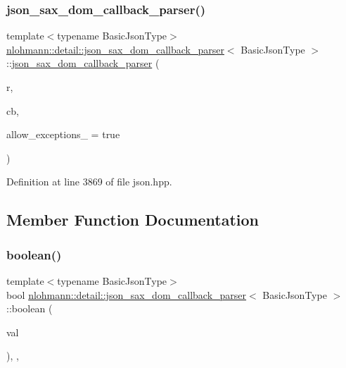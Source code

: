 \subsubsection{\texorpdfstring{json\+\_\+sax\+\_\+dom\+\_\+callback\+\_\+parser()}{json\_sax\_dom\_callback\_parser()}}
{\footnotesize\ttfamily template$<$typename Basic\+Json\+Type$>$ \\
\hyperlink{classnlohmann_1_1detail_1_1json__sax__dom__callback__parser}{nlohmann\+::detail\+::json\+\_\+sax\+\_\+dom\+\_\+callback\+\_\+parser}$<$ Basic\+Json\+Type $>$\+::\hyperlink{classnlohmann_1_1detail_1_1json__sax__dom__callback__parser}{json\+\_\+sax\+\_\+dom\+\_\+callback\+\_\+parser} (\begin{DoxyParamCaption}\item[{Basic\+Json\+Type \&}]{r,  }\item[{const \hyperlink{classnlohmann_1_1detail_1_1json__sax__dom__callback__parser_a4f636086fa8e7cf26c35c8afd50903ce}{parser\+\_\+callback\+\_\+t}}]{cb,  }\item[{const bool}]{allow\+\_\+exceptions\+\_\+ = {\ttfamily true} }\end{DoxyParamCaption})\hspace{0.3cm}{\ttfamily [inline]}}



Definition at line 3869 of file json.\+hpp.



\subsection{Member Function Documentation}
\mbox{\label{classnlohmann_1_1detail_1_1json__sax__dom__callback__parser_a945cb4ac399dad288ad31a67f26590a2}} 
\subsubsection{\texorpdfstring{boolean()}{boolean()}}
{\footnotesize\ttfamily template$<$typename Basic\+Json\+Type$>$ \\
bool \hyperlink{classnlohmann_1_1detail_1_1json__sax__dom__callback__parser}{nlohmann\+::detail\+::json\+\_\+sax\+\_\+dom\+\_\+callback\+\_\+parser}$<$ Basic\+Json\+Type $>$\+::boolean (\begin{DoxyParamCaption}\item[{bool}]{val }\end{DoxyParamCaption})\hspace{0.3cm}{\ttfamily [inline]}, {\ttfamily [override]}, {\ttfamily [virtual]}}



